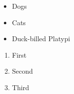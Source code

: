 \begin{itemize}
	\item Dogs
	\item Cats
	\item Duck-billed Platypi
\end{itemize}
\begin{enumerate}
	\item First
	\item Second
	\item Third
\end{enumerate}
